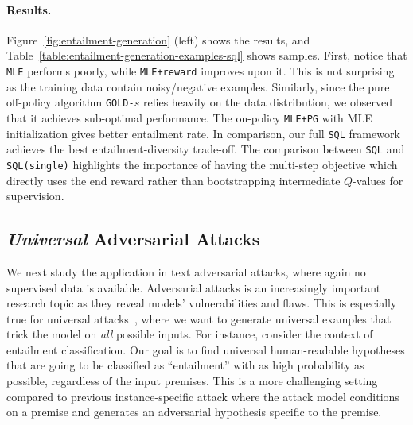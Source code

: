 \paragraph{Results.}
Figure~\ref{fig:entailment-generation} (left) shows the results, and Table~\ref{table:entailment-generation-examples-sql} shows samples.
First, notice that \texttt{MLE} performs poorly, while \texttt{MLE+reward} improves upon it. This is not surprising as the training data contain noisy/negative examples. Similarly, since the pure off-policy algorithm \texttt{GOLD-$s$} relies heavily on the data distribution, we observed that it achieves sub-optimal performance. The on-policy \texttt{MLE+PG} with MLE initialization gives better entailment rate.
In comparison, our full \texttt{SQL} framework achieves the best entailment-diversity trade-off. 
The comparison between \texttt{SQL} and \texttt{SQL(single)} highlights the importance of having the multi-step objective which directly uses the end reward rather than bootstrapping intermediate $Q$-values for supervision.



















\subsection{\textit{Universal} Adversarial Attacks}
\label{subsec:adversarial-attack}

We next study the application
in text adversarial attacks, where again no supervised data is available. 
Adversarial attacks is an increasingly important research topic as they reveal models' vulnerabilities and flaws. This is especially true for universal attacks~\citep{wallace2019universal,atanasova2020generating}, where we want to generate universal examples that trick the model on \emph{all} possible inputs. 
For instance, consider the context of entailment classification.
Our goal is to find universal human-readable hypotheses that are going to be classified as ``entailment'' with as high probability as possible, regardless of the input premises. This is a more challenging setting compared to previous instance-specific attack \citep{morris2020textattack,jin2020bert,ebrahimi2017hotflip} where the attack model conditions on a premise and generates an adversarial hypothesis specific to the premise. 


